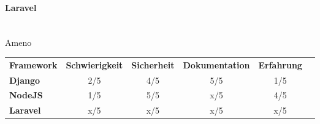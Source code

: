 \documentclass[11pt]{article}
\begin{document}
\paragraph{Laravel} \mbox{}\\
Ameno
\\

\begin{table}[ht]
\centering
\begin{tabular}{|l|c|c|c|c|l}
\cline{1-5}
\textbf{Framework} & \multicolumn{1}{l|}{\textbf{Schwierigkeit}} & \multicolumn{1}{l|}{\textbf{Sicherheit}} & \multicolumn{1}{l|}{\textbf{Dokumentation}} & \multicolumn{1}{l|}{\textbf{Erfahrung}} & \\ \cline{1-5}
\textbf{Django}    & 2/5                                         & 4/5                                      & 5/5                                         & 1/5                                     & \\ \cline{1-5}
\textbf{NodeJS}    & 1/5                                         & 5/5                                      & x/5                                         & 4/5                                     & \\ \cline{1-5}
\textbf{Laravel}   & x/5                                         & x/5                                      & x/5                                         & x/5                                     & \\ \cline{1-5}
\end{tabular}
\end{table}
\newpage
\end{document}
